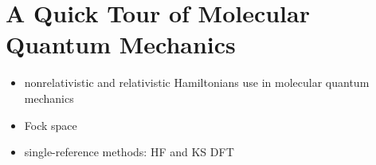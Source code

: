 \chapter{A Quick Tour of Molecular Quantum Mechanics}\label{ch:QM}

\begin{itemize}
  \item nonrelativistic and relativistic Hamiltonians use in molecular
    quantum mechanics
  \item Fock space
  \item single-reference methods: \ac{HF} and \ac{KS} \ac{DFT}
\end{itemize}

